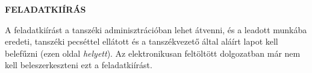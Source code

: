 \clearpage
\thispagestyle{empty} %
\begin{center}
\large
\textbf{FELADATKIÍRÁS}\\
\end{center}

A feladatkiírást a tanszéki adminisztrációban lehet átvenni, és a leadott munkába eredeti, tanszéki pecséttel ellátott és a tanszékvezető által aláírt lapot kell belefűzni (ezen oldal \emph{helyett}). Az elektronikusan feltöltött dolgozatban már nem kell beleszerkeszteni ezt a feladatkiírást.



